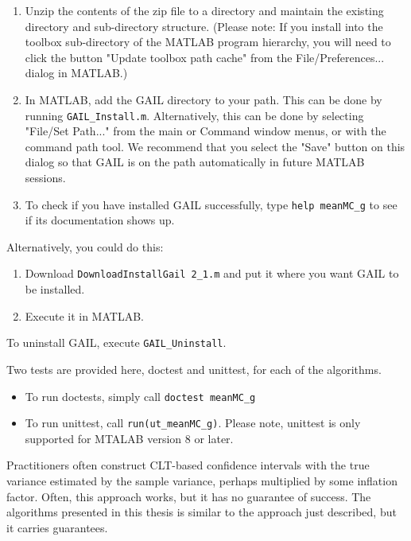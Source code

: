\documentclass{iitthesis}
\theoremstyle{definition}
\begin{document}
\begin{enumerate}
\item Unzip the contents of the zip file to a directory and maintain the existing directory and sub-directory structure. (Please note: If you install into the toolbox sub-directory of the MATLAB program hierarchy, you will need to click the button "Update toolbox path cache" from the File/Preferences... dialog in MATLAB.)
\item In MATLAB, add the GAIL directory to your path. This can be done by running {\tt GAIL{\_}Install.m}. Alternatively, this can be done by selecting "File/Set Path..." from the main or Command window menus, or with the command path tool. We recommend that you select the "Save" button on this dialog so that GAIL is on the path automatically in future MATLAB sessions.
\item To check if you have installed GAIL successfully, type {\tt help meanMC\_g} to see if its documentation shows up.
\end{enumerate}

Alternatively, you could do this:
\begin{enumerate}
\item Download {\tt DownloadInstallGail 2\_1.m} and put it where you want GAIL to be installed.
\item Execute it in MATLAB.
\end{enumerate}

To uninstall GAIL, execute {\tt GAIL\_Uninstall}.

Two tests are provided here, doctest and unittest, for each of the algorithms.
\begin{itemize}
\item To run doctests, simply call {\tt doctest meanMC\_g}
\item To run unittest, call {\tt run(ut\_meanMC\_g)}. Please note, unittest is only supported for MTALAB version 8 or later.
\end{itemize}


\label{chapter:comclusion}

Practitioners often construct CLT-based confidence intervals with the true variance estimated by the sample variance, perhaps multiplied by some inflation factor.  Often, this approach works, but it has no guarantee of success.  The algorithms presented in this thesis is similar to the approach just described, but it carries guarantees. 
\end{document}
